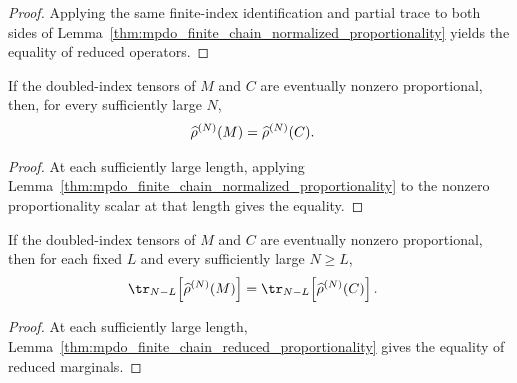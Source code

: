 \begin{proof}\leanok
    Applying the same finite-index identification and partial trace to both
    sides of
    Lemma~\ref{thm:mpdo_finite_chain_normalized_proportionality} yields the
    equality of reduced operators.
\end{proof}

\begin{lemma}
    \label{thm:mpdo_eventual_normalized_proportionality}
    \leanok
    If the doubled-index tensors of $M$ and $C$ are eventually nonzero
    proportional, then, for every sufficiently large $N$,
    \begin{align}
        \widehat\rho^{(N)}(M)
         & =
        \widehat\rho^{(N)}(C).
        \notag
    \end{align}
\end{lemma}

\begin{proof}\leanok
    At each sufficiently large length, applying
    Lemma~\ref{thm:mpdo_finite_chain_normalized_proportionality} to the
    nonzero proportionality scalar at that length gives the equality.
\end{proof}

\begin{lemma}
    \label{thm:mpdo_eventual_reduced_proportionality}
    \leanok
    If the doubled-index tensors of $M$ and $C$ are eventually nonzero
    proportional, then for each fixed $L$ and every sufficiently large
    $N\geq L$,
    \begin{align}
        \tr_{N-L}\!\left[\widehat\rho^{(N)}(M)\right]
         & =
        \tr_{N-L}\!\left[\widehat\rho^{(N)}(C)\right].
        \notag
    \end{align}
\end{lemma}

\begin{proof}\leanok
    At each sufficiently large length,
    Lemma~\ref{thm:mpdo_finite_chain_reduced_proportionality} gives the
    equality of reduced marginals.
\end{proof}

